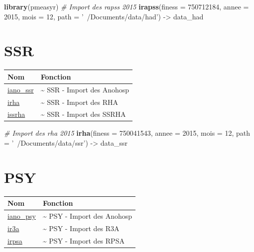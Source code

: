 \documentclass[]{book}
\newenvironment{Shaded}{\begin{snugshade}}{\end{snugshade}}
\newcommand{\KeywordTok}[1]{\textcolor[rgb]{0.13,0.29,0.53}{\textbf{{#1}}}}
\newcommand{\DataTypeTok}[1]{\textcolor[rgb]{0.13,0.29,0.53}{{#1}}}
\newcommand{\DecValTok}[1]{\textcolor[rgb]{0.00,0.00,0.81}{{#1}}}
\newcommand{\StringTok}[1]{\textcolor[rgb]{0.31,0.60,0.02}{{#1}}}
\newcommand{\CommentTok}[1]{\textcolor[rgb]{0.56,0.35,0.01}{\textit{{#1}}}}
\newcommand{\NormalTok}[1]{{#1}}
\begin{document}
\begin{Shaded}
\begin{Highlighting}[]
\KeywordTok{library}\NormalTok{(pmeasyr)}
\CommentTok{# Import des rapss 2015}
\KeywordTok{irapss}\NormalTok{(}\DataTypeTok{finess =} \DecValTok{750712184}\NormalTok{,}
       \DataTypeTok{annee =} \DecValTok{2015}\NormalTok{,}
       \DataTypeTok{mois =} \DecValTok{12}\NormalTok{,}
       \DataTypeTok{path =} \StringTok{'~/Documents/data/had'}\NormalTok{) ->}\StringTok{ }\NormalTok{data_had}
\end{Highlighting}
\end{Shaded}

\section{SSR}\label{ssr}

\begin{longtable}[]{@{}ll@{}}
\toprule
Nom & Fonction\tabularnewline
\midrule
\endhead
\href{https://github.com/IM-APHP/pmeasyr/tree/master/Rd_md/iano_ssr.Rmd}{iano\_ssr}
& \textasciitilde{} SSR - Import des Anohosp\tabularnewline
\href{https://github.com/IM-APHP/pmeasyr/tree/master/Rd_md/irha.Rmd}{irha}
& \textasciitilde{} SSR - Import des RHA\tabularnewline
\href{https://github.com/IM-APHP/pmeasyr/tree/master/Rd_md/issrha.Rmd}{issrha}
& \textasciitilde{} SSR - Import des SSRHA\tabularnewline
\bottomrule
\end{longtable}

\begin{Shaded}
\begin{Highlighting}[]
\CommentTok{# Import des rha 2015}
\KeywordTok{irha}\NormalTok{(}\DataTypeTok{finess =} \DecValTok{750041543}\NormalTok{,}
     \DataTypeTok{annee =} \DecValTok{2015}\NormalTok{,}
     \DataTypeTok{mois =} \DecValTok{12}\NormalTok{,}
     \DataTypeTok{path =} \StringTok{'~/Documents/data/ssr'}\NormalTok{) ->}\StringTok{ }\NormalTok{data_ssr}
\end{Highlighting}
\end{Shaded}

\section{PSY}\label{psy}

\begin{longtable}[]{@{}ll@{}}
\toprule
Nom & Fonction\tabularnewline
\midrule
\endhead
\href{https://github.com/IM-APHP/pmeasyr/tree/master/Rd_md/iano_psy.Rmd}{iano\_psy}
& \textasciitilde{} PSY - Import des Anohosp\tabularnewline
\href{https://github.com/IM-APHP/pmeasyr/tree/master/Rd_md/ir3a.Rmd}{ir3a}
& \textasciitilde{} PSY - Import des R3A\tabularnewline
\href{https://github.com/IM-APHP/pmeasyr/tree/master/Rd_md/irpsa.Rmd}{irpsa}
& \textasciitilde{} PSY - Import des RPSA\tabularnewline
\bottomrule
\end{longtable}
\end{document}
